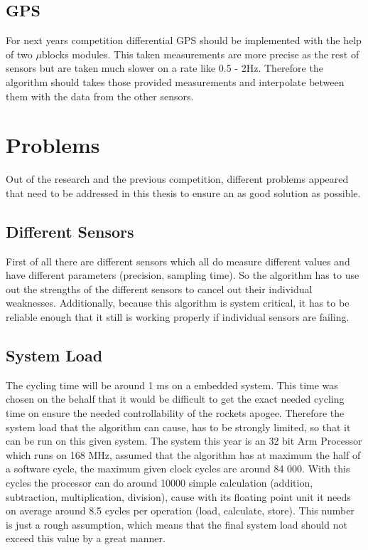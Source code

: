  \subsection{GPS}
 For next years competition differential GPS should be implemented with the help of two $\mu$blocks modules.
 This taken measurements are more precise as the rest of sensors but are taken much slower on a rate like 0.5 - 2Hz. 
 Therefore the algorithm should takes those provided measurements and interpolate between them with the data from the other sensors.
 
 \section{Problems}
 Out of the research and the previous competition, different problems appeared that need to be addressed in this thesis to ensure an as good solution as possible.
 
 \subsection{Different Sensors}
 First of all there are different sensors which all do measure different values and have different parameters (precision, sampling time).
 So the algorithm has to use out the strengths of the different sensors to cancel out their individual weaknesses.
 Additionally, because this algorithm is system critical, it has to be reliable enough that it still is working properly if individual sensors are failing. 
 
 \subsection{System Load}
 The cycling time will be around 1 ms on a embedded system. This time was chosen on the behalf that it would be difficult to get the exact needed cycling time on ensure the needed controllability of the rockets apogee.
 Therefore the system load that the algorithm can cause, has to be strongly limited, so that it can be run on this given system. 
 The system this year is an 32 bit Arm Processor which runs on 168 MHz, assumed that the algorithm has at maximum the half of a software cycle, the maximum given clock cycles are around 84 000.
 With this cycles the processor can do around 10000 simple calculation (addition, subtraction, multiplication, division),
 cause with its floating point unit it needs on average around 8.5 cycles per operation (load, calculate, store). 
 This number is just a rough assumption, which means that the final system load should not exceed this value by a great manner.
 
